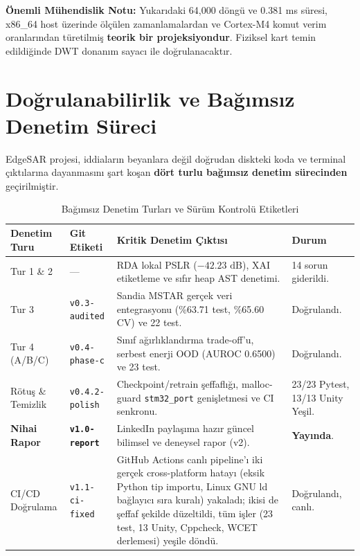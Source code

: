 \documentclass[11pt,a4paper]{article}
\begin{document}
\noindent\textbf{Önemli Mühendislik Notu:} Yukarıdaki 64,000 döngü ve 0.381 ms süresi, x86\_64 host üzerinde ölçülen zamanlamalardan ve Cortex-M4 komut verim oranlarından türetilmiş \textbf{teorik bir projeksiyondur}. Fiziksel kart temin edildiğinde DWT donanım sayacı ile doğrulanacaktır.

\clearpage
\section{Doğrulanabilirlik ve Bağımsız Denetim Süreci}

EdgeSAR projesi, iddiaların beyanlara değil doğrudan diskteki koda ve terminal çıktılarına dayanmasını şart koşan \textbf{dört turlu bağımsız denetim sürecinden} geçirilmiştir.

\begin{table}[htbp]
\centering
\small
\caption{Bağımsız Denetim Turları ve Sürüm Kontrolü Etiketleri}
\label{tab:audit_history}
\begin{tabularx}{\textwidth}{llp{5.5cm}X}
\toprule
\textbf{Denetim Turu} & \textbf{Git Etiketi} & \textbf{Kritik Denetim Çıktısı} & \textbf{Durum} \\
\midrule
Tur 1 \& 2 & --- & RDA lokal PSLR ($-42.23\text{ dB}$), XAI etiketleme ve sıfır heap AST denetimi. & 14 sorun giderildi. \\
Tur 3 & \texttt{v0.3-audited} & Sandia MSTAR gerçek veri entegrasyonu (\%63.71 test, \%65.60 CV) ve 22 test. & Doğrulandı. \\
Tur 4 (A/B/C) & \texttt{v0.4-phase-c} & Sınıf ağırlıklandırma trade-off'u, serbest enerji OOD (AUROC 0.6500) ve 23 test. & Doğrulandı. \\
Rötuş \& Temizlik & \texttt{v0.4.2-polish} & Checkpoint/retrain şeffaflığı, malloc-guard \texttt{stm32\_port} genişletmesi ve CI senkronu. & 23/23 Pytest, 13/13 Unity Yeşil. \\
\textbf{Nihai Rapor} & \textbf{\texttt{v1.0-report}} & LinkedIn paylaşıma hazır güncel bilimsel ve deneysel rapor (v2). & \textbf{Yayında}. \\
CI/CD Doğrulama & \texttt{v1.1-ci-fixed} & GitHub Actions canlı pipeline'ı iki gerçek cross-platform hatayı (eksik Python tip importu, Linux GNU ld bağlayıcı sıra kuralı) yakaladı; ikisi de şeffaf şekilde düzeltildi, tüm işler (23 test, 13 Unity, Cppcheck, WCET derlemesi) yeşile döndü. & Doğrulandı, canlı. \\
\bottomrule
\end{tabularx}
\end{table}
\end{document}
